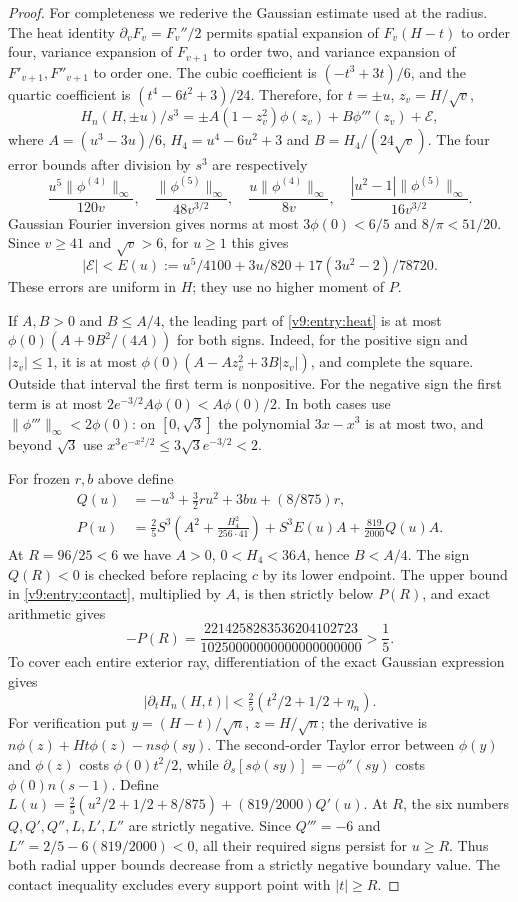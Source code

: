 \begin{proof}
For completeness we rederive the Gaussian estimate used at the radius.
The heat identity $\partial_vF_v=F_v''/2$ permits spatial expansion of
$F_v(H-t)$ to order four, variance expansion of $F_{v+1}$ to order two,
and variance expansion of $F'_{v+1},F''_{v+1}$ to order one. The cubic
coefficient is $(-t^3+3t)/6$, and the quartic coefficient is
$(t^4-6t^2+3)/24$. Therefore, for $t=\pm u$, $z_v=H/\sqrt v$,
\begin{equation}\label{v9:entry:heat}
 H_n(H,\pm u)/s^3
 =\pm A(1-z_v^2)\phi(z_v)+B\phi'''(z_v)+\mathcal E,
\end{equation}
where $A=(u^3-3u)/6$, $H_4=u^4-6u^2+3$ and $B=H_4/(24\sqrt v)$.
The four error bounds after division by $s^3$ are respectively
\[
 \frac{u^5\|\phi^{(4)}\|_\infty}{120v},\quad
 \frac{\|\phi^{(5)}\|_\infty}{48v^{3/2}},\quad
 \frac{u\|\phi^{(4)}\|_\infty}{8v},\quad
 \frac{|u^2-1|\|\phi^{(5)}\|_\infty}{16v^{3/2}}.
\]
Gaussian Fourier inversion gives norms at most $3\phi(0)<6/5$ and
$8/\pi<51/20$. Since $v\ge41$ and $\sqrt v>6$, for $u\ge1$ this gives
\[
 |\mathcal E|<E(u):=u^5/4100+3u/820+17(3u^2-2)/78720.
\]
These errors are uniform in $H$; they use no higher moment of $P$.

If $A,B>0$ and $B\le A/4$, the leading part of \eqref{v9:entry:heat}
is at most $\phi(0)(A+9B^2/(4A))$ for both signs. Indeed, for the
positive sign and $|z_v|\le1$, it is at most
$\phi(0)(A-Az_v^2+3B|z_v|)$, and complete the square. Outside that
interval the first term is nonpositive. For the negative sign the first
term is at most $2e^{-3/2}A\phi(0)<A\phi(0)/2$. In both cases use
$\|\phi'''\|_\infty<2\phi(0)$: on $[0,\sqrt3]$ the polynomial
$3x-x^3$ is at most two, and beyond $\sqrt3$ use
$x^3e^{-x^2/2}\le3\sqrt3e^{-3/2}<2$.

For frozen $r,b$ above define
\begin{align*}
 Q(u)&=-u^3+\tfrac32ru^2+3bu+(8/875)r,\\
 P(u)&=\tfrac25 S^3\left(A^2+\frac{H_4^2}{256\cdot41}\right)
                         +S^3E(u)A+\frac{819}{2000}Q(u)A.
\end{align*}
At $R=96/25<6$ we have $A>0$, $0<H_4<36A$, hence $B<A/4$.
The sign $Q(R)<0$ is checked before replacing $c$ by its lower endpoint.
The upper bound in \eqref{v9:entry:contact}, multiplied by $A$, is then
strictly below $P(R)$, and exact arithmetic gives
\[
 -P(R)=\frac{2214258283536204102723}{10250000000000000000000}>\frac15.
\]
To cover each entire exterior ray, differentiation of the exact Gaussian
expression gives
\[
 |\partial_tH_n(H,t)|<\tfrac25(t^2/2+1/2+\eta_n).
\]
For verification put $y=(H-t)/\sqrt n$, $z=H/\sqrt n$; the derivative is
$n\phi(z)+Ht\phi(z)-ns\phi(sy)$. The second-order Taylor error between
$\phi(y)$ and $\phi(z)$ costs $\phi(0)t^2/2$, while
$\partial_s[s\phi(sy)]=-\phi''(sy)$ costs $\phi(0)n(s-1)$.
Define $L(u)=\tfrac25(u^2/2+1/2+8/875)+(819/2000)Q'(u)$.
At $R$, the six numbers $Q,Q',Q'',L,L',L''$ are strictly negative.
Since $Q'''=-6$ and $L''=2/5-6(819/2000)<0$, all their required signs
persist for $u\ge R$. Thus both radial upper bounds decrease from a
strictly negative boundary value. The contact inequality excludes every
support point with $|t|\ge R$.
\end{proof}


